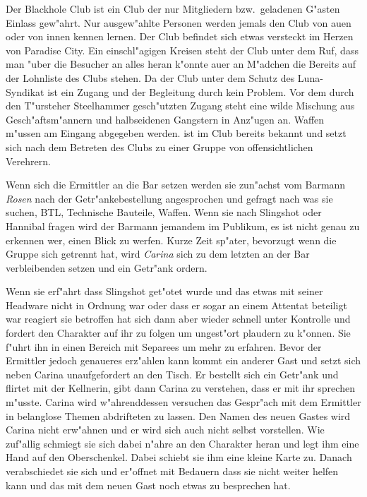 
Der Blackhole Club ist ein Club der nur Mitgliedern bzw.~geladenen G"asten Einlass gew"ahrt. Nur ausgew"ahlte Personen werden jemals den Club von au\3en oder von innen kennen lernen. Der Club befindet sich etwas versteckt im Herzen von Paradise City. Ein einschl"agigen Kreisen steht der Club unter dem Ruf, dass man "uber die Besucher an alles heran k"onnte au\3er an M"adchen die Bereits auf der Lohnliste des Clubs stehen. Da der Club unter dem Schutz des Luna-Syndikat ist ein Zugang und der Begleitung durch \xl{} kein Problem. Vor dem durch den T"ursteher Steelhammer gesch"utzten Zugang steht eine wilde Mischung aus Gesch"aftsm"annern und halbseidenen Gangstern in Anz"ugen an. Waffen m"ussen am Eingang abgegeben werden. \xl{} ist im Club bereits bekannt und setzt sich nach dem Betreten des Clubs zu einer Gruppe von offensichtlichen Verehrern.

Wenn sich die Ermittler an die Bar setzen werden sie zun"achst vom Barmann \emph{Rosen} nach der Getr"ankebestellung angesprochen und gefragt nach was sie suchen, BTL, Technische Bauteile, Waffen. Wenn sie nach Slingshot oder Hannibal fragen wird der Barmann jemandem im Publikum, es ist nicht genau zu erkennen wer, einen Blick zu werfen. Kurze Zeit sp"ater, bevorzugt wenn die Gruppe sich getrennt hat, wird \emph{Carina} sich zu dem letzten an der Bar verbleibenden setzen und ein Getr"ank ordern.


Wenn sie erf"ahrt dass Slingshot get"otet wurde und das etwas mit seiner Headware nicht in Ordnung war oder dass er sogar an einem Attentat beteiligt war reagiert sie betroffen hat sich dann aber wieder schnell unter Kontrolle und fordert den Charakter auf ihr zu folgen um ungest"ort plaudern zu k"onnen. Sie f"uhrt ihn in einen Bereich mit Separees um mehr zu erfahren. Bevor der Ermittler jedoch genaueres erz"ahlen kann kommt ein anderer Gast und setzt sich neben Carina unaufgefordert an den Tisch. Er bestellt sich ein Getr"ank und flirtet mit der Kellnerin, gibt dann Carina zu verstehen, dass er mit ihr sprechen m"usste. Carina wird w"ahrenddessen versuchen das Gespr"ach mit dem Ermittler in belanglose Themen abdrifteten zu lassen. Den Namen des neuen Gastes wird Carina nicht erw"ahnen und er wird sich auch nicht selbst vorstellen. Wie zuf"allig schmiegt sie sich dabei n"ahre an den Charakter heran und legt ihm eine Hand auf den Oberschenkel. Dabei schiebt sie ihm eine kleine Karte zu. Danach verabschiedet sie sich und er"offnet mit Bedauern dass sie nicht weiter helfen kann und das mit dem neuen Gast noch etwas zu besprechen hat.

